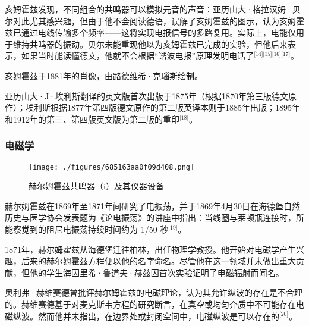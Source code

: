 亥姆霍兹发现，不同组合的共鸣器可以模拟元音的声音：亚历山大·格拉汉姆·贝尔对此尤其感兴趣，但由于他不会阅读德语，误解了亥姆霍兹的图示，认为亥姆霍兹已通过电线传输多个频率——这将实现电报信号的多路复用。实际上，电能仅用于维持共鸣器的振动。贝尔未能重现他以为亥姆霍兹已完成的实验，但他后来表示，如果当时能读懂德文，他就不会根据“谐波电报”原理发明电话了\(^\text{[14][15][16][17]}\)。

亥姆霍兹于1881年的肖像，由路德维希·克瑙斯绘制。

亚历山大·J·埃利斯翻译的英文版首次出版于1875年（根据1870年第三版德文原作）；埃利斯根据1877年第四版德文原作的第二版英译本则于1885年出版；1895年和1912年的第三、第四版英文版为第二版的重印\(^\text{[18]}\)。
\subsubsection{电磁学}
\begin{figure}[ht]
\centering
\texttt{[image: ./figures/685163aa0f09d408.png]}
\caption{赫尔姆霍兹共鸣器（i）及其仪器设备} \label{fig_HEMfhm_5}
\end{figure}
赫尔姆霍兹在1869年至1871年间研究了电振荡，并于1869年4月30日在海德堡自然历史与医学协会发表题为《论电振荡》的讲座中指出：当线圈与莱顿瓶连接时，所能察觉到的阻尼电振荡持续时间约为 1/50 秒\(^\text{[19]}\)。

1871年，赫尔姆霍兹从海德堡迁往柏林，出任物理学教授。他开始对电磁学产生兴趣，后来的赫尔姆霍兹方程便以他的名字命名。尽管他在这一领域并未做出重大贡献，但他的学生海因里希·鲁道夫·赫兹因首次实验证明了电磁辐射而闻名。

奥利弗·赫维赛德曾批评赫尔姆霍兹的电磁理论，认为其允许纵波的存在是不合理的。赫维赛德基于对麦克斯韦方程的研究断言，在真空或均匀介质中不可能存在电磁纵波。然而他并未指出，在边界处或封闭空间中，电磁纵波是可以存在的\(^\text{[20]}\)。

